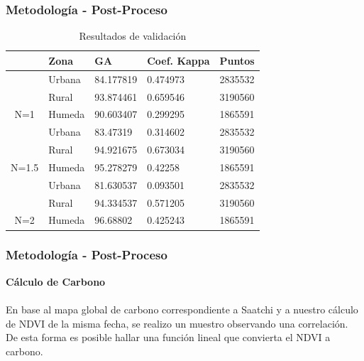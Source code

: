 \documentclass[xcolor=table]{beamer}
\begin{document}
\begin{frame}
	\frametitle{Metodolog\'ia - Post-Proceso}

\begin{table}[]
	\centering
	\begin{tabular}{|c|l|l|l|l|}
		\hline
		\rowcolor[HTML]{FFFFC7} 
		\multicolumn{1}{|l|}{\cellcolor[HTML]{FFFFC7}Coeficiente de tolerancia} & Zona   & GA        & Coef. Kappa & Puntos  \\ \hline
		& Urbana & 84.177819 & 0.474973    & 2835532 \\ \cline{2-5} 
		& Rural  & 93.874461 & 0.659546    & 3190560 \\ \cline{2-5} 
		\multirow{-3}{*}{N=1}                                                   & Humeda & 90.603407 & 0.299295    & 1865591 \\ \hline
		& Urbana & 83.47319  & 0.314602    & 2835532 \\ \cline{2-5} 
		& Rural  & 94.921675 & 0.673034    & 3190560 \\ \cline{2-5} 
		\multirow{-3}{*}{N=1.5}                                                 & Humeda & 95.278279 & 0.42258     & 1865591 \\ \hline
		& Urbana & 81.630537 & 0.093501    & 2835532 \\ \cline{2-5} 
		& Rural  & 94.334537 & 0.571205    & 3190560 \\ \cline{2-5} 
		\multirow{-3}{*}{N=2}                                                   & Humeda & 96.68802  & 0.425243    & 1865591 \\ \hline
	\end{tabular}
	\caption{Resultados de validaci\'on}
	\label{my-label}
\end{table}
	
\end{frame}

\begin{frame}
	\frametitle{Metodolog\'ia - Post-Proceso}
	\textbf{C\'alculo de Carbono}\\~\\	
	En base al mapa global de carbono correspondiente a Saatchi y a nuestro c\'alculo de NDVI de la misma fecha, se realizo un muestro observando una correlaci\'on. De esta forma es posible hallar una funci\'on lineal que convierta el NDVI a carbono.
	
\end{frame}
\end{document}
